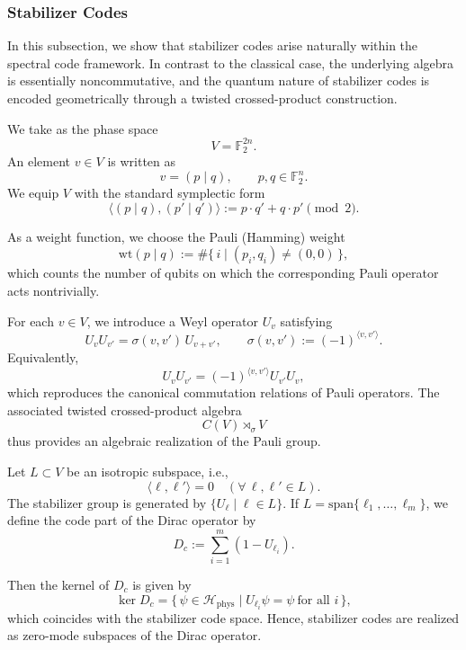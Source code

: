 \documentclass[12pt]{article}
\theoremstyle{definition} %
\theoremstyle{plain} %
\theoremstyle{remark} %
\theoremstyle{underline}
\begin{document}
\subsubsection{Stabilizer Codes}

In this subsection, we show that stabilizer codes arise naturally within the spectral code framework. In contrast to the classical case, the underlying algebra is essentially noncommutative, and the quantum nature of stabilizer codes is encoded geometrically through a twisted crossed-product construction.

We take as the phase space
\[
    V=\mathbb{F}_2^{2n}.
\]
An element $v\in V$ is written as
\[
    v=(p\mid q), \qquad p,q\in\mathbb{F}_2^n.
\]
We equip $V$ with the standard symplectic form
\[
    \langle (p\mid q),(p'\mid q')\rangle
    := p\cdot q' + q\cdot p' \pmod{2}.
\]

As a weight function, we choose the Pauli (Hamming) weight
\[
    \mathrm{wt}(p\mid q)
    := \#\{\,i \mid (p_i,q_i)\neq (0,0)\,\},
\]
which counts the number of qubits on which the corresponding Pauli operator acts nontrivially.

For each $v\in V$, we introduce a Weyl operator $U_v$ satisfying
\[
    U_v U_{v'} = \sigma(v,v')\,U_{v+v'},
    \qquad
    \sigma(v,v'):=(-1)^{\langle v,v'\rangle}.
\]
Equivalently,
\[
    U_v U_{v'} = (-1)^{\langle v,v'\rangle} U_{v'} U_v,
\]
which reproduces the canonical commutation relations of Pauli operators.
The associated twisted crossed-product algebra
\[
    C(V)\rtimes_\sigma V
\]
thus provides an algebraic realization of the Pauli group.

Let $L\subset V$ be an isotropic subspace, i.e.,
\[
    \langle \ell,\ell'\rangle = 0
    \quad
    (\forall\,\ell,\ell'\in L).
\]
The stabilizer group is generated by $\{U_\ell\mid \ell\in L\}$.
If $L=\mathrm{span}\{\ell_1,\dots,\ell_m\}$, we define the code part of the Dirac
operator by
\[
    D_c := \sum_{i=1}^m (1-U_{\ell_i}).
\]

Then the kernel of $D_c$ is given by
\[
    \ker D_c
    =
    \{\,\psi\in\mathcal{H}_{\mathrm{phys}}
    \mid
    U_{\ell_i}\psi=\psi\ \text{for all } i\,\},
\]
which coincides with the stabilizer code space. Hence, stabilizer codes are realized as zero-mode subspaces of the Dirac operator.
\end{document}
